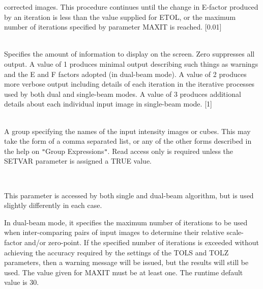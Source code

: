\documentclass[twoside,11pt]{article}
\renewcommand{\_}{\texttt{\symbol{95}}}
\newcommand{\sstsubsection}[1]{ \item[{#1}] \mbox{} \\}
\newcommand{\sstsubsection}[1]{\item[{#1}]}
\begin{document}
{{{         corrected images. This procedure continues until the change in
         E-factor produced by an iteration is less than the value supplied
         for ETOL, or the maximum number of iterations specified by parameter
         MAXIT is reached. [0.01]
      }
      \sstsubsection{
         ILEVEL = \_INTEGER (Read)
      }{
         Specifies the amount of information to display on the screen.
         Zero suppresses all output. A value of 1 produces minimal output
         describing such things as warnings and the E and F factors
         adopted (in dual-beam mode). A value of 2 produces more verbose
         output including details of each iteration in the iterative
         processes used by both dual and single-beam modes. A value of
         3 produces additional details about each individual input image in
         single-beam mode. [1]
      }
      \sstsubsection{
         IN = NDF (Update)
      }{
         A group specifying the names of the input intensity images or
         cubes. This may take the form of a comma separated list, or any of
         the other forms described in the help on {\tt "}Group Expressions{\tt "}. Read
         access only is required unless the SETVAR parameter is assigned a
         TRUE value.
      }
      \sstsubsection{
         MAXIT = \_INTEGER (Read)
      }{
         This parameter is accessed by both single and dual-beam
         algorithm, but is used slightly differently in each case.

         In dual-beam mode, it specifies the maximum number of iterations
         to be used when inter-comparing pairs of input images to determine
         their relative scale-factor and/or zero-point. If the specified
         number of iterations is exceeded without achieving the accuracy
         required by the settings of the TOLS and TOLZ parameters, then a
         warning message will be issued, but the results will still be used.
         The value given for MAXIT must be at least one. The runtime
         default value is 30.

}}}
\end{document}
